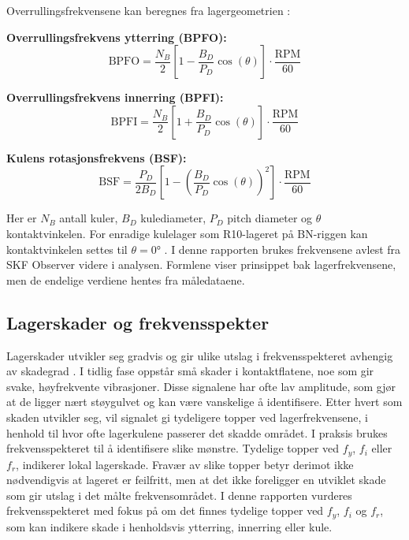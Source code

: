 Overrullingsfrekvensene kan beregnes fra lagergeometrien \parencite{beregninglager}:

\textbf{Overrullingsfrekvens ytterring (BPFO):}
\[
\text{BPFO} = \frac{N_B}{2} \left[ 1 - \frac{B_D}{P_D}\cos(\theta) \right] \cdot \frac{\text{RPM}}{60}
\]

\textbf{Overrullingsfrekvens innerring (BPFI):}
\[
\text{BPFI} = \frac{N_B}{2} \left[ 1 + \frac{B_D}{P_D}\cos(\theta) \right] \cdot \frac{\text{RPM}}{60}
\]

\textbf{Kulens rotasjonsfrekvens (BSF):}
\[
\text{BSF} = \frac{P_D}{2 B_D} \left[ 1 - \left( \frac{B_D}{P_D} \cos(\theta) \right)^2 \right] \cdot \frac{\text{RPM}}{60}
\]

Her er $N_B$ antall kuler, $B_D$ kulediameter, $P_D$ pitch diameter og $\theta$ kontaktvinkelen. For enradige kulelager som R10-lageret på BN-riggen kan kontaktvinkelen settes til $\theta = 0°$ \parencite{beregninglager}. I denne rapporten brukes frekvensene avlest fra SKF Observer videre i analysen. Formlene viser prinsippet bak lagerfrekvensene, men de endelige verdiene hentes fra måledataene.

\subsection{Lagerskader og frekvensspekter}
Lagerskader utvikler seg gradvis og gir ulike utslag i frekvensspekteret avhengig av skadegrad \parencite{vibrasjon3}. I tidlig fase oppstår små skader i kontaktflatene, noe som gir svake, høyfrekvente vibrasjoner. Disse signalene har ofte lav amplitude, som gjør at de ligger nært støygulvet og kan være vanskelige å identifisere. 
\newline Etter hvert som skaden utvikler seg, vil signalet gi tydeligere topper ved lagerfrekvensene, i henhold til hvor ofte lagerkulene passerer det skadde området.
\newline I praksis brukes frekvensspekteret til å identifisere slike mønstre. Tydelige topper ved $f_y$, $f_i$ eller $f_r$, indikerer lokal lagerskade. Fravær av slike topper betyr derimot ikke nødvendigvis at lageret er feilfritt, men at det ikke foreligger en utviklet skade som gir utslag i det målte frekvensområdet.
\newline I denne rapporten vurderes frekvensspekteret med fokus på om det finnes tydelige topper ved $f_y$, $f_i$ og $f_r$, som kan indikere skade i henholdsvis ytterring, innerring eller kule.


